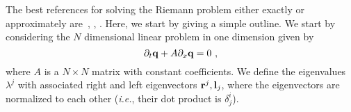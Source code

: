 \documentclass{article}
\begin{document}
The best references for solving the Riemann problem either exactly or
approximately are~\cite{leveque}, \cite{toro}, \cite{laney}. Here, we start by 
giving a simple outline. We
start by considering the $N$ dimensional linear problem in one
dimension given by
\begin{equation}
  \label{lsrp}
  \partial_t {\bf q} + A \partial_{x} {\bf q} = 0  \ ,
\end{equation}
where $A$ is a $N\times N$ matrix with constant coefficients. We
define the eigenvalues $\lambda^j$ with associated right and left
eigenvectors ${\bf r}^j,{\bf l}_j$, where the eigenvectors are
normalized to each other ({\it i.e.}, their dot product is
$\delta^i_j$). 
%
\end{document}
